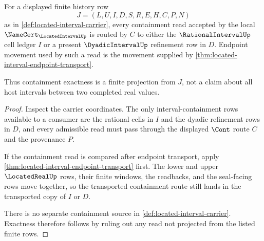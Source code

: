 \begin{theorem}
\label{thm:locatedinterval-containment-exactness}
For a displayed finite history row
$$
J=(L,U,I,D,S,R,E,H,C,P,N)
$$
as in \autoref{def:located-interval-carrier}, every containment read accepted by the local $\NameCert_{\LocatedIntervalUp}$ is routed by $C$ to either the $\RationalIntervalUp$ cell ledger $I$ or a present $\DyadicIntervalUp$ refinement row in $D$. Endpoint movement used by such a read is the movement supplied by \autoref{thm:located-interval-endpoint-transport}.

Thus containment exactness is a finite projection from $J$, not a claim about all host intervals between two completed real values.
\end{theorem}
\begin{proof}
Inspect the carrier coordinates. The only interval-containment rows available to a consumer are the rational cells in $I$ and the dyadic refinement rows in $D$, and every admissible read must pass through the displayed $\Cont$ route $C$ and the provenance $P$.

If the containment read is compared after endpoint transport, apply \autoref{thm:located-interval-endpoint-transport} first. The lower and upper $\LocatedRealUp$ rows, their finite windows, the readbacks, and the seal-facing rows move together, so the transported containment route still lands in the transported copy of $I$ or $D$.

There is no separate containment source in \autoref{def:located-interval-carrier}. Exactness therefore follows by ruling out any read not projected from the listed finite rows.
\end{proof}


